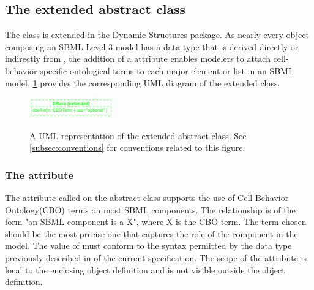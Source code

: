 
\subsection{The extended  abstract class}
\label{subsec:extSBase}

The \SBase class is extended in the Dynamic Structures package. As nearly every object composing an SBML Level 3 model has a data type that is derived directly or indirectly from \SBase, the addition of a  attribute enables modelers to attach cell-behavior specific ontological terms to each major element or list in an SBML model. \ref{fig:UMLExtendedSBase} provides the corresponding UML diagram of the extended \SBase class. 


\begin{figure}[tbhp]
	\centering
	\includegraphics[width=0.32\textwidth]{images/UMLExtendedSBase.pdf}\\
	\caption{A UML representation of the extended \SBase abstract class. See \ref{subsec:conventions} for conventions related to this figure.} \label{fig:UMLExtendedSBase}
\end{figure}

\subsubsection{The  attribute}
\label{attr:cboTerm}

The attribute called  on the \SBase abstract class supports the use of Cell Behavior Ontology(CBO) terms on most SBML components. The relationship is of the form "an SBML component is-a X", where X is the CBO term. The term chosen should be the most precise one that captures the role of the component in the model. The value of  must conform to the syntax permitted by the  data type previously described in  of the current specification. The scope of the  attribute is local to the enclosing object definition and is not visible outside the object definition. 


